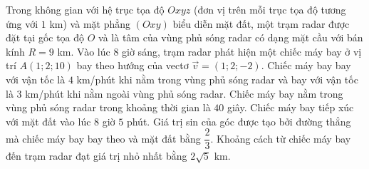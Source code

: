 \begin{ex}
Trong không gian với hệ trục tọa độ $Oxyz$ (đơn vị trên mỗi trục tọa độ tương ứng với $1$ km) và mặt phẳng $(Oxy)$ biểu diễn mặt đất, một trạm radar được đặt tại gốc tọa độ $O$ và là tâm của vùng phủ sóng radar có dạng mặt cầu với bán kính $R=9$ km. Vào lúc $8$ giờ sáng, trạm radar phát hiện một chiếc máy bay ở vị trí $A(1;2;10)$ bay theo hướng của vectơ $\vec v=(1;2;-2)$. Chiếc máy bay bay với vận tốc là $4$ km/phút khi nằm trong vùng phủ sóng radar và bay với vận tốc là $3$ km/phút khi nằm ngoài vùng phủ sóng radar.
\choiceTF
{Chiếc máy bay nằm trong vùng phủ sóng radar trong khoảng thời gian là $40$ giây.}
{Chiếc máy bay tiếp xúc với mặt đất vào lúc $8$ giờ $5$ phút.}
{\True Giá trị sin của góc được tạo bởi đường thẳng mà chiếc máy bay bay theo và mặt đất bằng $\dfrac23$.}
{Khoảng cách từ chiếc máy bay đến trạm radar đạt giá trị nhỏ nhất bằng $2\sqrt5$ km.}
\end{ex}
